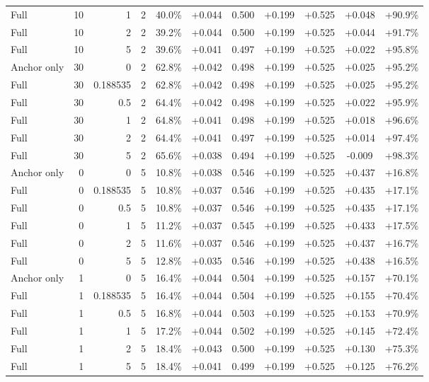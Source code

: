 \begin{table}[htbp]
\begin{tabular}{lrrrccccccc}
Full & 10 & 1 & 2 & 40.0\% & +0.044 & 0.500 & +0.199 & +0.525 & +0.048 & +90.9\% \\
Full & 10 & 2 & 2 & 39.2\% & +0.044 & 0.500 & +0.199 & +0.525 & +0.044 & +91.7\% \\
Full & 10 & 5 & 2 & 39.6\% & +0.041 & 0.497 & +0.199 & +0.525 & +0.022 & +95.8\% \\
Anchor only & 30 & 0 & 2 & 62.8\% & +0.042 & 0.498 & +0.199 & +0.525 & +0.025 & +95.2\% \\
Full & 30 & 0.188535 & 2 & 62.8\% & +0.042 & 0.498 & +0.199 & +0.525 & +0.025 & +95.2\% \\
Full & 30 & 0.5 & 2 & 64.4\% & +0.042 & 0.498 & +0.199 & +0.525 & +0.022 & +95.9\% \\
Full & 30 & 1 & 2 & 64.8\% & +0.041 & 0.498 & +0.199 & +0.525 & +0.018 & +96.6\% \\
Full & 30 & 2 & 2 & 64.4\% & +0.041 & 0.497 & +0.199 & +0.525 & +0.014 & +97.4\% \\
Full & 30 & 5 & 2 & 65.6\% & +0.038 & 0.494 & +0.199 & +0.525 & -0.009 & +98.3\% \\
Anchor only & 0 & 0 & 5 & 10.8\% & +0.038 & 0.546 & +0.199 & +0.525 & +0.437 & +16.8\% \\
Full & 0 & 0.188535 & 5 & 10.8\% & +0.037 & 0.546 & +0.199 & +0.525 & +0.435 & +17.1\% \\
Full & 0 & 0.5 & 5 & 10.8\% & +0.037 & 0.546 & +0.199 & +0.525 & +0.435 & +17.1\% \\
Full & 0 & 1 & 5 & 11.2\% & +0.037 & 0.545 & +0.199 & +0.525 & +0.433 & +17.5\% \\
Full & 0 & 2 & 5 & 11.6\% & +0.037 & 0.546 & +0.199 & +0.525 & +0.437 & +16.7\% \\
Full & 0 & 5 & 5 & 12.8\% & +0.035 & 0.546 & +0.199 & +0.525 & +0.438 & +16.5\% \\
Anchor only & 1 & 0 & 5 & 16.4\% & +0.044 & 0.504 & +0.199 & +0.525 & +0.157 & +70.1\% \\
Full & 1 & 0.188535 & 5 & 16.4\% & +0.044 & 0.504 & +0.199 & +0.525 & +0.155 & +70.4\% \\
Full & 1 & 0.5 & 5 & 16.8\% & +0.044 & 0.503 & +0.199 & +0.525 & +0.153 & +70.9\% \\
Full & 1 & 1 & 5 & 17.2\% & +0.044 & 0.502 & +0.199 & +0.525 & +0.145 & +72.4\% \\
Full & 1 & 2 & 5 & 18.4\% & +0.043 & 0.500 & +0.199 & +0.525 & +0.130 & +75.3\% \\
Full & 1 & 5 & 5 & 18.4\% & +0.041 & 0.499 & +0.199 & +0.525 & +0.125 & +76.2\% \\

\end{tabular}
\end{table}
